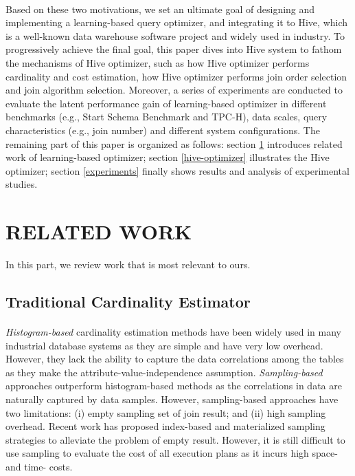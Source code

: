     \paragraph{}
    Based on these two motivations, we set an ultimate goal of designing and implementing a learning-based query optimizer, and 
    integrating it to Hive\cite{Hive}, which is a well-known data warehouse software project and widely used in industry. 
    To progressively achieve the final goal, this paper dives into Hive system to fathom the mechanisms of Hive optimizer, such as how Hive optimizer performs 
    cardinality and cost estimation, how Hive optimizer performs join order selection and join algorithm selection. Moreover, a series of experiments are 
    conducted to evaluate the latent performance gain of learning-based optimizer in different benchmarks (e.g., Start Schema Benchmark and TPC-H), data scales, 
    query characteristics (e.g., join number) and different system configurations. The remaining part of this paper is organized as follows: section \ref{related_work} 
    introduces related work of learning-based optimizer; section \ref{hive-optimizer} illustrates the Hive optimizer; section \ref{experiments} finally shows results 
    and analysis of experimental studies.         

\section{RELATED WORK}\label{related_work}
    In this part, we review work that is most relevant to ours.
    \subsection{Traditional Cardinality Estimator}
    \paragraph{}
    \emph{Histogram-based} cardinality estimation methods\cite{Self-Tuning-Histograms} have been widely used in many 
    industrial database systems as they are simple and have very low overhead. However, they lack the ability to capture 
    the data correlations among the tables as they make the attribute-value-independence assumption. 
    \emph{Sampling-based} approaches\cite{Two-Level-Sampling} outperform histogram-based methods as the correlations 
    in data are naturally captured by data samples. However, sampling-based approaches have two limitations: (i) empty 
    sampling set of join result; and (ii) high sampling overhead. Recent work has proposed index-based and 
    materialized sampling strategies to alleviate the problem of empty result. However, it is still difficult to use 
    sampling to evaluate the cost of all execution plans as it incurs high space- and time- costs.
    
